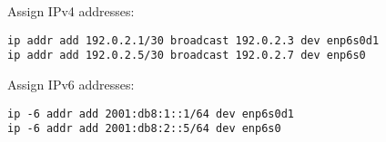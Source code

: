 Assign IPv4 addresses:
\begin{lstlisting}
ip addr add 192.0.2.1/30 broadcast 192.0.2.3 dev enp6s0d1
ip addr add 192.0.2.5/30 broadcast 192.0.2.7 dev enp6s0
\end{lstlisting}
Assign IPv6 addresses:
\begin{lstlisting}
ip -6 addr add 2001:db8:1::1/64 dev enp6s0d1
ip -6 addr add 2001:db8:2::5/64 dev enp6s0
\end{lstlisting}


